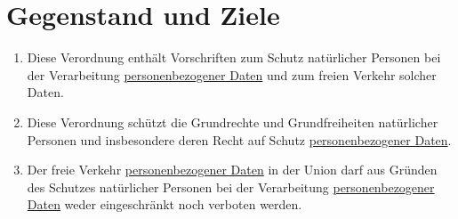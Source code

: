 \chapter{Gegenstand und Ziele}
\label{ch:1}


\begin{enumerate}

  \item Diese Verordnung enthält Vorschriften zum Schutz natürlicher Personen bei der Verarbeitung \hyperref[itm:04-1]
   {personenbezogener Daten} und zum freien Verkehr solcher Daten.
  \label{itm:01-1}

  \item Diese Verordnung schützt die Grundrechte und Grundfreiheiten natürlicher Personen und insbesondere deren Recht
   auf Schutz \hyperref[itm:04-1]{personenbezogener Daten}.
  \label{itm:01-2}

  \item Der freie Verkehr \hyperref[itm:04-1]{personenbezogener Daten} in der Union darf aus Gründen des Schutzes
   natürlicher Personen bei der Verarbeitung \hyperref[itm:04-1]{personenbezogener Daten} weder eingeschränkt noch
   verboten werden.
  \label{itm:01-3}

\end{enumerate}

